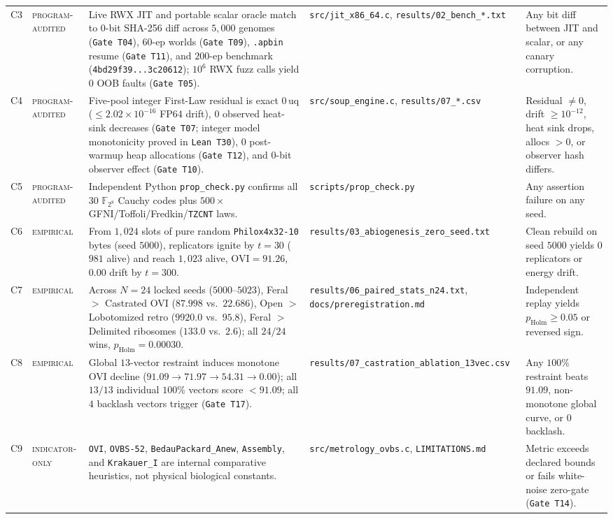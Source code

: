 \documentclass[11pt,reqno]{amsart}
\theoremstyle{plain}
\theoremstyle{definition}
\theoremstyle{remark}
\newcommand{\tcode}[1]{{\scriptsize\nolinkurl{#1}}}
\newcommand{\tagpa}{\textsc{program-audited}}
\newcommand{\tagem}{\textsc{empirical}}
\newcommand{\tagio}{\textsc{indicator-only}}
\begin{document}
\begin{table}[t]
\begin{tabularx}{\textwidth}{@{}P{0.58cm}P{2.05cm}YP{2.80cm}P{2.40cm}@{}}
C3 & \tagpa & Live RWX JIT and portable scalar oracle match to $0$-bit SHA-256 diff across $5{,}000$ genomes (\tcode{Gate T04}), $60$-ep worlds (\tcode{Gate T09}), \tcode{.apbin} resume (\tcode{Gate T11}), and $200$-ep benchmark (\tcode{4bd29f39...3c20612}); $10^6$ RWX fuzz calls yield $0$ OOB faults (\tcode{Gate T05}). & \tcode{src/jit_x86_64.c}, \tcode{results/02_bench_*.txt} & Any bit diff between JIT and scalar, or any canary corruption. \\
C4 & \tagpa & Five-pool integer First-Law residual is exact $0\,\mathrm{uq}$ ($\le 2.02\times 10^{-16}$ FP64 drift), $0$ observed heat-sink decreases (\tcode{Gate T07}; integer model monotonicity proved in \tcode{Lean T30}), $0$ post-warmup heap allocations (\tcode{Gate T12}), and $0$-bit observer effect (\tcode{Gate T10}). & \tcode{src/soup_engine.c}, \tcode{results/07_*.csv} & Residual $\ne 0$, drift $\ge 10^{-12}$, heat sink drops, allocs $>0$, or observer hash differs. \\
C5 & \tagpa & Independent Python \tcode{prop_check.py} confirms all $30$ $\mathbb{F}_{2^8}$ Cauchy codes plus $500\times$ GFNI/Toffoli/Fredkin/\tcode{TZCNT} laws. & \tcode{scripts/prop_check.py} & Any assertion failure on any seed. \\
C6 & \tagem & From $1{,}024$ slots of pure random \tcode{Philox4x32-10} bytes (seed $5000$), replicators ignite by $t=30$ ($981$ alive) and reach $1{,}023$ alive, $\mathrm{OVI}=91.26$, $0.00$ drift by $t=300$. & \tcode{results/03_abiogenesis_zero_seed.txt} & Clean rebuild on seed $5000$ yields $0$ replicators or energy drift. \\
C7 & \tagem & Across $N=24$ locked seeds ($5000$--$5023$), Feral $>$ Castrated OVI ($87.998$ vs.\ $22.686$), Open $>$ Lobotomized retro ($9920.0$ vs.\ $95.8$), Feral $>$ Delimited ribosomes ($133.0$ vs.\ $2.6$); all $24/24$ wins, $p_{\mathrm{Holm}}=0.00030$. & \tcode{results/06_paired_stats_n24.txt}, \tcode{docs/preregistration.md} & Independent replay yields $p_{\mathrm{Holm}} \ge 0.05$ or reversed sign. \\
C8 & \tagem & Global $13$-vector restraint induces monotone OVI decline ($91.09 \to 71.97 \to 54.31 \to 0.00$); all $13/13$ individual $100\%$ vectors score $< 91.09$; all $4$ backlash vectors trigger (\tcode{Gate T17}). & \tcode{results/07_castration_ablation_13vec.csv} & Any $100\%$ restraint beats $91.09$, non-monotone global curve, or $0$ backlash. \\
C9 & \tagio & \tcode{OVI}, \tcode{OVBS-52}, \tcode{BedauPackard_Anew}, \tcode{Assembly}, and \tcode{Krakauer_I} are internal comparative heuristics, not physical biological constants. & \tcode{src/metrology_ovbs.c}, \tcode{LIMITATIONS.md} & Metric exceeds declared bounds or fails white-noise zero-gate (\tcode{Gate T14}). \\

\end{tabularx}
\end{table}
\end{document}
